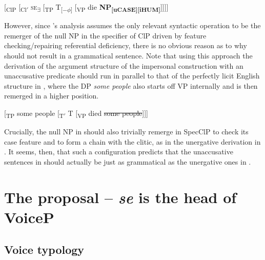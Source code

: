 \documentclass[output=paper,
modfonts,nonflat,
newtxmath
]{langsci/langscibook}
\begin{document}
\begin{exe}
\ex \label{ex:lenardic: 16} {[\textsubscript{ClP} [\textsubscript{Cl$'$} \textsc{se}\textsubscript{\textbf{$\exists$}} [\textsubscript{TP} T\textsubscript{[$-\phi$]}  [\textsubscript{VP} die \textbf{NP}\textsubscript{\textbf{[uCASE][iHUM]}}]]]]}
\end{exe} \par

\noindent However, since \citeauthor{riverosheppard2003}’s analysis assumes the only relevant syntactic operation to be the remerger of the null NP in the specifier of ClP driven by feature checking/repairing referential deficiency, there is no obvious reason as to why  should not result in a grammatical sentence. Note that using this approach the derivation of the argument structure of the impersonal construction with an unaccusative predicate should run in parallel to that of the perfectly licit English structure in , where the DP \textit{some people} also starts off VP internally and is then remerged in a higher position.

\begin{exe}
\ex \label{sope} {[\textsubscript{TP} some people [\textsubscript{T$'$} T [\textsubscript{VP} died \st{some people}]]]}
\end{exe}
\noindent Crucially, the null NP in  should also trivially remerge in SpecClP to check its case feature and to form a chain with the clitic, as in  the unergative derivation in . It seems, then, that such a configuration predicts that the unaccusative sentences in  should actually be just as grammatical as the unergative ones in .

\section{The proposal -- \textit{se} is the head of VoiceP} \label{sec4}

\subsection{ Voice typology} \label{sec4.1}
\end{document}
